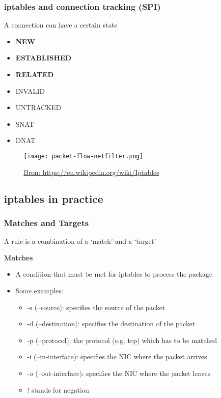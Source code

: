 \documentclass{article}
\begin{document}
\subsubsection{iptables and connection tracking (SPI)}

A connection can have a certain state

\begin{itemize}
    \item \textbf{NEW}
    \item \textbf{ESTABLISHED}
    \item \textbf{RELATED}
    \item INVALID
    \item UNTRACKED
    \item SNAT
    \item DNAT
\end{itemize}

\begin{figure}[H]
    \centering
    \texttt{[image: packet-flow-netfilter.png]}
    \caption{\url{Bron: https://en.wikipedia.org/wiki/Iptables}}
\end{figure}

\subsection{iptables in practice}

\subsubsection{Matches and Targets}

A rule is a combination of a `match' and a `target'

\textbf{Matches}

\begin{itemize}
    \item A condition that must be met for iptables to process the package
    \item Some examples:
    \begin{itemize}
        \item -s (--source): specifies the source of the packet
        \item -d (--destination): specifies the destination of the packet
        \item -p (--protocol): the protocol (e.g. tcp) which has to be matched
        \item -i (--in-interface): specifies the NIC where the packet arrives
        \item -o (--out-interface): specifies the NIC where the packet leaves
        \item ! stands for negation
    \end{itemize}
\end{itemize}
\end{document}
